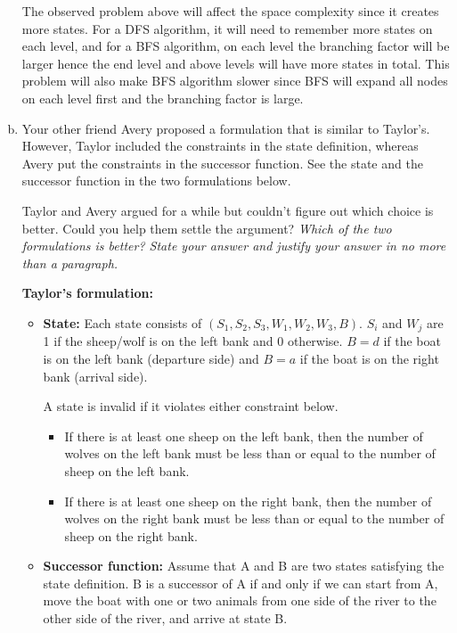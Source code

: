 \documentclass[12pt]{article}
\begin{document}
\begin{enumerate}[(a)]
The observed problem above will affect the space complexity since it creates more states. For a DFS algorithm, it will need to remember more states on each level, and for a BFS algorithm, on each level the branching factor will be larger hence the end level and above levels will have more states in total. This problem will also make BFS algorithm slower since BFS will expand all nodes on each level first and the branching factor is large.



\item
\label{mc_part_critique_formulation_2}
Your other friend Avery proposed a formulation that is similar to Taylor's. However, Taylor included the constraints in the state definition, whereas Avery put the constraints in the successor function. See the state and the successor function in the two formulations below.

Taylor and  Avery argued for a while but couldn't figure out which choice is better. Could you help them settle the argument? {\em Which of the two formulations is better? State your answer and justify your answer in no more than a paragraph.}

\begin{example}
{\bf Taylor's formulation:}

\begin{itemize}
\item
{\bf State:} Each state consists of $(S_1, S_2, S_3, W_1, W_2, W_3, B)$. $S_i$ and $W_j$ are 1 if the sheep/wolf is on the left bank and 0 otherwise. $B = d$ if the boat is on the left bank (departure side) and $B = a$ if the boat is on the right bank (arrival side). 

A state is invalid if it violates either constraint below.

\begin{itemize}
\item 
If there is at least one sheep on the left bank, then the number of wolves on the left bank must be less than or equal to the number of sheep on the left bank. 

\item
If there is at least one sheep on the right bank, then the number of wolves on the right bank must be less than or equal to the number of sheep on the right bank. 
\end{itemize}

\item
{\bf Successor function:} Assume that A and B are two states satisfying the state definition. B is a successor of A if and only if we can start from A, move the boat with one or two animals from one side of the river to the other side of the river, and arrive at state B. 


\end{itemize}
\end{example}
\end{enumerate}
\end{document}

